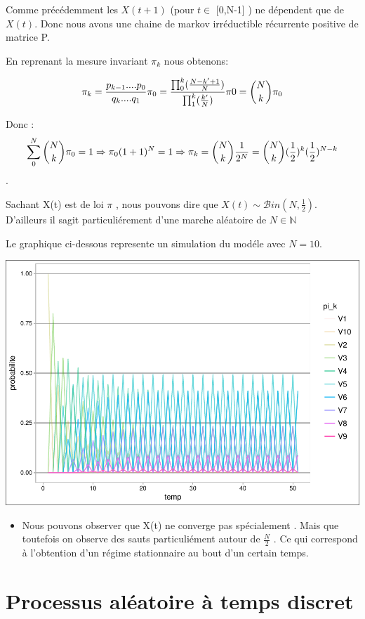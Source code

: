 \documentclass[11pt,]{article}
\providecommand{\tightlist}{%
  \setlength{\itemsep}{0pt}\setlength{\parskip}{0pt}}
\begin{document}
Comme précédemment les \(X(t+1)\) (pour \(t \in\) {[}0,N-1{]} ) ne
dépendent que de \(X(t)\). Donc nous avons une chaine de markov
irréductible récurrente positive de matrice P.

En reprenant la mesure invariant \(\pi_k\) nous obtenons:

\[\pi_k=\frac{p_{k-1}....p_0}{q_{k}....q_1}\pi_0=
\frac{\prod_0^k(\frac{N-k'+1}{N})}{\prod_1^k(\frac{k'}{N})}\pi0=\binom{N}{k}\pi_0\\\]

Donc : \[\sum_0^N\binom{N}{k}\pi_0=1 \Rightarrow \pi_0(1+1)^N=1 \\
\Rightarrow \pi_k=\binom{N}{k}\frac{1}{2^N}=\binom{N}{k}(\frac{1}{2})^k(\frac{1}{2})^{N-k} \].

Sachant X(t) est de loi \(\pi\) , nous pouvons dire que
\(X(t) \sim \mathcal{B}in(N,\frac{1}{2})\). D'ailleurs il sagit
particuliérement d'une marche aléatoire de \(N \in \mathbb{N}\)

Le graphique ci-dessous represente un simulation du modéle avec
\(N=10\).

\includegraphics{money_exchange_files/figure-latex/unnamed-chunk-6-1.pdf}

\begin{itemize}
\tightlist
\item
  Nous pouvons observer que X(t) ne converge pas spécialement . Mais que
  toutefois on observe des sauts particuliément autour de
  \(\frac{N}{2}\) . Ce qui correspond à l'obtention d'un régime
  stationnaire au bout d'un certain temps.
\end{itemize}

\section{Processus aléatoire à temps
discret}\label{processus-aleatoire-a-temps-discret}
\end{document}
